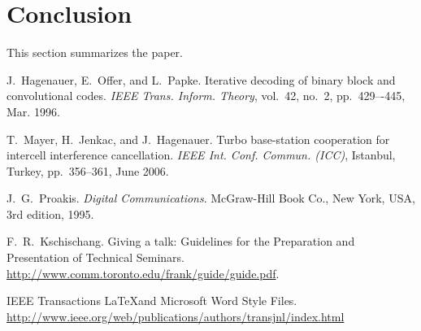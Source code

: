 \documentclass[journal, a4paper]{IEEEtran}
\begin{document}
\section{Conclusion}
    This section summarizes the paper.

\begin{thebibliography}{5}

    J.~Hagenauer, E.~Offer, and L.~Papke. Iterative decoding of binary block
    and convolutional codes. {\em IEEE Trans. Inform. Theory},
    vol.~42, no.~2, pp.~429–-445, Mar. 1996.

    T.~Mayer, H.~Jenkac, and J.~Hagenauer. Turbo base-station cooperation for intercell interference cancellation. {\em IEEE Int. Conf. Commun. (ICC)}, Istanbul, Turkey, pp.~356--361, June 2006.

    J.~G.~Proakis. {\em Digital Communications}. McGraw-Hill Book Co.,
    New York, USA, 3rd edition, 1995.

    F.~R.~Kschischang. Giving a talk: Guidelines for the Preparation and Presentation of Technical Seminars.
    \url{http://www.comm.toronto.edu/frank/guide/guide.pdf}.

    IEEE Transactions \LaTeX and Microsoft Word Style Files.
    \url{http://www.ieee.org/web/publications/authors/transjnl/index.html}

\end{thebibliography}

\end{document}
